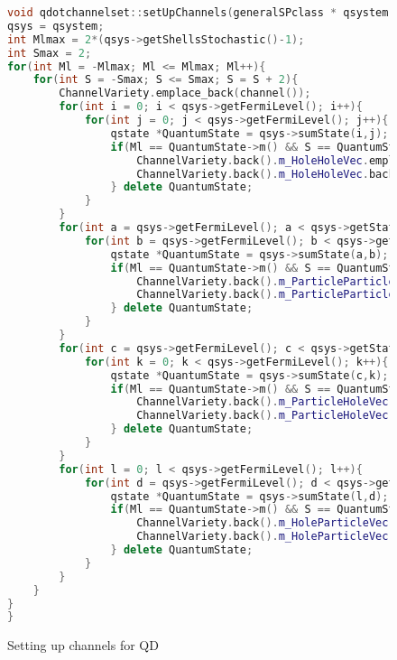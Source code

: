 \begin{figure}
\begin{lstlisting}[language=C++]
void qdotchannelset::setUpChannels(generalSPclass * qsystem){
qsys = qsystem;
int Mlmax = 2*(qsys->getShellsStochastic()-1);
int Smax = 2;
for(int Ml = -Mlmax; Ml <= Mlmax; Ml++){
	for(int S = -Smax; S <= Smax; S = S + 2){
		ChannelVariety.emplace_back(channel());
		for(int i = 0; i < qsys->getFermiLevel(); i++){
			for(int j = 0; j < qsys->getFermiLevel(); j++){
				qstate *QuantumState = qsys->sumState(i,j);
				if(Ml == QuantumState->m() && S == QuantumState->s() && i != j){
					ChannelVariety.back().m_HoleHoleVec.emplace_back(channelindexpair());
					ChannelVariety.back().m_HoleHoleVec.back().set(i, j);
				} delete QuantumState;
			}
		}
		for(int a = qsys->getFermiLevel(); a < qsys->getStatesStochastic(); a++){
			for(int b = qsys->getFermiLevel(); b < qsys->getStatesStochastic(); b++){
				qstate *QuantumState = qsys->sumState(a,b);
				if(Ml == QuantumState->m() && S == QuantumState->s() && a != b){
					ChannelVariety.back().m_ParticleParticleVec.emplace_back(channelindexpair());
					ChannelVariety.back().m_ParticleParticleVec.back().set(a, b);
				} delete QuantumState;
			}
		}
		for(int c = qsys->getFermiLevel(); c < qsys->getStatesStochastic(); c++){
			for(int k = 0; k < qsys->getFermiLevel(); k++){
				qstate *QuantumState = qsys->sumState(c,k);
				if(Ml == QuantumState->m() && S == QuantumState->s() && c != k){
					ChannelVariety.back().m_ParticleHoleVec.emplace_back(channelindexpair());
					ChannelVariety.back().m_ParticleHoleVec.back().set(c, k);
				} delete QuantumState;
			}
		}
		for(int l = 0; l < qsys->getFermiLevel(); l++){			
			for(int d = qsys->getFermiLevel(); d < qsys->getStatesStochastic(); d++){
				qstate *QuantumState = qsys->sumState(l,d);
				if(Ml == QuantumState->m() && S == QuantumState->s() && l != d){
					ChannelVariety.back().m_HoleParticleVec.emplace_back(channelindexpair());
					ChannelVariety.back().m_HoleParticleVec.back().set(l, d);
				} delete QuantumState;
			}
		}
	}
}
}

\end{lstlisting}
\caption{Setting up channels for QD} \label{f:vectors_for_channels}
\end{figure}



